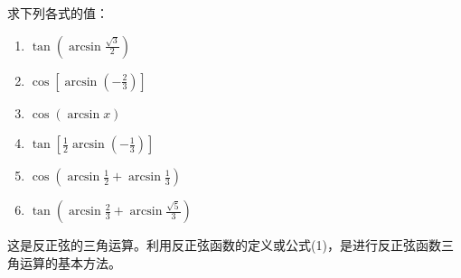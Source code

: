 \begin{example}
求下列各式的值：
\begin{multicols}{2}
\begin{enumerate}[(1)]
    \item $\tan\left(\arcsin \frac{\sqrt{3}}{2}\right)$
    \item $\cos\left[\arcsin \left(-\frac{2}{3}\right)\right]$
    \item $\cos\left(\arcsin x\right)$
    \item $\tan\left[\frac{1}{2}\arcsin\left(-\frac{1}{3}\right) \right]$
    \item $\cos\left(\arcsin\frac{1}{2}+\arcsin \frac{1}{3} \right)$
    \item $\tan\left(\arcsin\frac{2}{3}+\arcsin \frac{\sqrt{5}}{3}\right)$
\end{enumerate}
\end{multicols}
\end{example}

\begin{analyze}
 这是反正弦的三角运算。利用反正弦函数的定义或公式(1)，是进行反正弦函数三角运算的基本方法。
\end{analyze}


